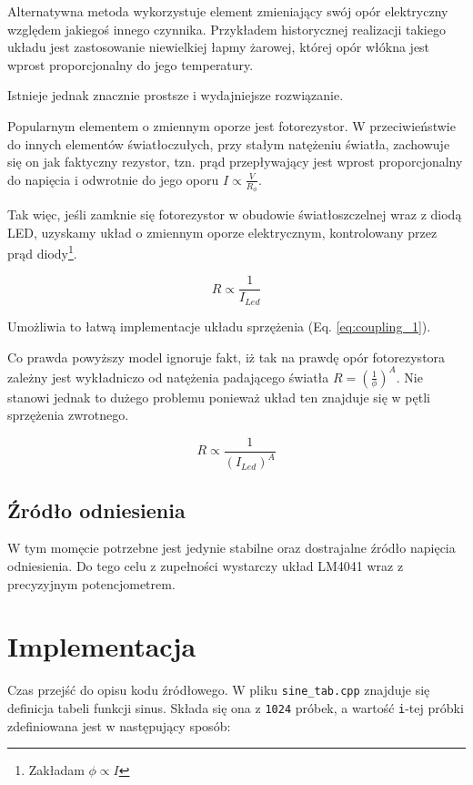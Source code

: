 \documentclass[12pt, a4paper]{article}
\begin{document}
Alternatywna metoda wykorzystuje element zmieniający swój opór elektryczny względem jakiegoś innego czynnika.
Przykładem historycznej realizacji takiego układu jest zastosowanie niewielkiej łapmy żarowej,
której opór włókna jest wprost proporcjonalny do jego temperatury.

Istnieje jednak znacznie prostsze i wydajniejsze rozwiązanie.

Popularnym elementem o zmiennym oporze jest fotorezystor. W przeciwieństwie do innych elementów
światłoczułych, przy stałym natężeniu światła, zachowuje się on jak faktyczny rezystor,
tzn. prąd przepływający jest wprost proporcjonalny do napięcia i odwrotnie do jego oporu
$I \propto \frac{V}{R_{\phi}}$.

Tak więc, jeśli zamknie się fotorezystor w obudowie światłoszczelnej wraz z diodą LED,
uzyskamy układ o zmiennym oporze elektrycznym, kontrolowany przez prąd diody\footnote{Zakładam $\phi \propto I$}.

\begin{equation}
	R \propto \frac{1}{I_{Led}}
\end{equation}

Umożliwia to łatwą implementacje układu sprzężenia (Eq. \ref{eq:coupling_1}). 

Co prawda powyższy model ignoruje fakt,
iż tak na prawdę opór fotorezystora zależny jest wykładniczo od natężenia padającego światła
$R = \left(\frac{1}{\phi}\right)^A$. Nie stanowi jednak to dużego problemu ponieważ układ ten znajduje się w 
pętli sprzężenia zwrotnego.

\begin{equation}
	R \propto \frac{1}{(I_{Led})^A}
\end{equation}

\subsection{Źródło odniesienia}
W tym momęcie potrzebne jest jedynie stabilne oraz dostrajalne źródło napięcia odniesienia.
Do tego celu z zupełności wystarczy układ LM4041 wraz z precyzyjnym potencjometrem.

\section{Implementacja}
\label{sec:impl}
Czas przejść do opisu kodu źródłowego.
W pliku \verb|sine_tab.cpp| znajduje się definicja tabeli funkcji sinus. Składa się ona z \verb|1024| próbek, a wartość \verb|i|-tej próbki 
zdefiniowana jest w następujący sposób:
\end{document}
